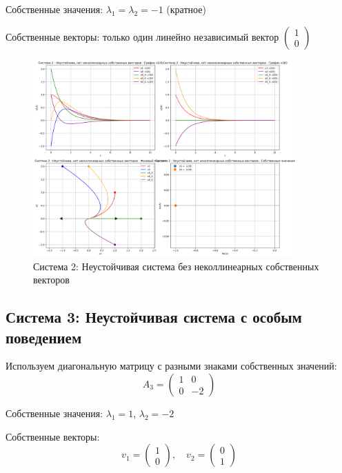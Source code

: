 Собственные значения: $\lambda_1 = \lambda_2 = -1$ (кратное)

Собственные векторы: только один линейно независимый вектор $\begin{pmatrix} 1 \\ 0 \end{pmatrix}$

\begin{figure}[h!]
\centering
\includegraphics[width=0.9\textwidth]{images/task1/система_2_-_неустойчива,_нет_неколлинеарных_собственных_векторов.png}
\caption{Система 2: Неустойчивая система без неколлинеарных собственных векторов}
\label{fig:system2}
\end{figure}

\subsection{Система 3: Неустойчивая система с особым поведением}

Используем диагональную матрицу с разными знаками собственных значений:
\begin{equation}
A_3 = \begin{pmatrix} 1 & 0 \\ 0 & -2 \end{pmatrix}
\end{equation}

Собственные значения: $\lambda_1 = 1$, $\lambda_2 = -2$

Собственные векторы:
\begin{equation}
v_1 = \begin{pmatrix} 1 \\ 0 \end{pmatrix}, \quad v_2 = \begin{pmatrix} 0 \\ 1 \end{pmatrix}
\end{equation}

